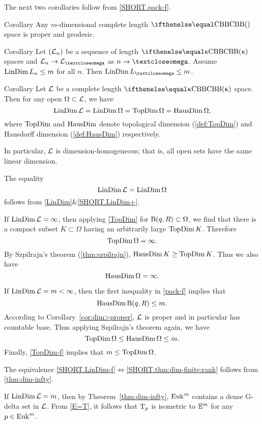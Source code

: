 The next two corollaries follow from \ref{SHORT.pack-f}.

\begin{thm}{Corollary}\label{cor:dim>proper}
Any $m$-dimensional complete length $\Alex{}$ space is proper and geodesic.
\end{thm}

\begin{thm}{Corollary} Let $(\mathcal{L}_n)$ be a sequence of length $\Alex\kappa$ spaces and $\spc{L}_n\to \spc{L}_\o$ as $n\to\o$.
Assume $\LinDim L_n\le m$ for all $n$.
Then $\LinDim L_\o\le m$.
\end{thm}

\begin{thm}{Corollary}\label{dim=dim} 
Let $\mathcal{L}$ be a complete length $\Alex{\kappa}$ space. 
Then for any open $\Omega\subset \spc{L}$, we have
\[
\mathop{\rm LinDim}\nolimits \mathcal{L}=
\mathop{\rm LinDim}\nolimits\Omega =
\mathop{\rm TopDim}\nolimits\Omega=
\mathop{\rm HausDim}\nolimits\Omega,
\]
where $\mathop{\rm TopDim}\nolimits$ and $\mathop{\rm HausDim}\nolimits$ denote topological dimension (\ref{def:TopDim}) and Hausdorff dimension (\ref{def:HausDim}) respectively.

In particular, $\mathcal{L}$ is dimension-homogeneous; that is, all open sets have the same linear dimension.
\end{thm}

The equality
\[\mathop{\rm LinDim}\nolimits \mathcal{L}= \mathop{\rm LinDim}\nolimits\Omega\]
follows from \ref{LinDim}$\&$\ref{SHORT.LinDim+}.

If $\mathop{\rm LinDim}\nolimits \mathcal{L}=\infty$, then
applying \ref{TopDim} for $\oBall(q,R)\subset \Omega$, we find that there is a compact subset $K\subset \Omega$ having an arbitrarily large $\mathop{\rm TopDim}\nolimits K$. Therefore
\[\mathop{\rm TopDim}\nolimits\Omega=\infty.\] 
By Szpilrajn's theorem (\ref{thm:szpilrajn}),
$\HausDim K\ge \TopDim K$.
Thus we also have 
\[\mathop{\rm HausDim}\nolimits\Omega=\infty.\]

If $\mathop{\rm LinDim}\nolimits \mathcal{L}=m<\infty$, then the first inequality in \ref{pack-f} 
implies that \[\HausDim \oBall(q,R)\le m.\] 
According to Corollary~\ref{cor:dim>proper}, 
$\mathcal{L}$ is proper and in particular has countable base. 
Thus applying Szpilrajn's theorem again, we have
\[\TopDim\Omega\le \HausDim \Omega\le m.\]
Finally, \ref{TopDim-f} implies that $m\le\TopDim\Omega$.
\qeds

The equivalence \ref{SHORT.LinDim-f}$\Leftrightarrow$\ref{SHORT.thm:dim-finite:rank} follows from \ref{thm:dim-infty}.

If $\mathop{\rm LinDim}\nolimits\mathcal{L}=m$, then by Theorem~\ref{thm:dim-infty}, 
$\mathop{\rm Euk}\nolimits^m$ contains a dense G-delta set in $\mathcal{L}$.
From \ref{E=T}, it follows that $\text{\rm T}_p$ is isometric to $\mathbb{E}^m$ for any $p\in \Euk^m$.

